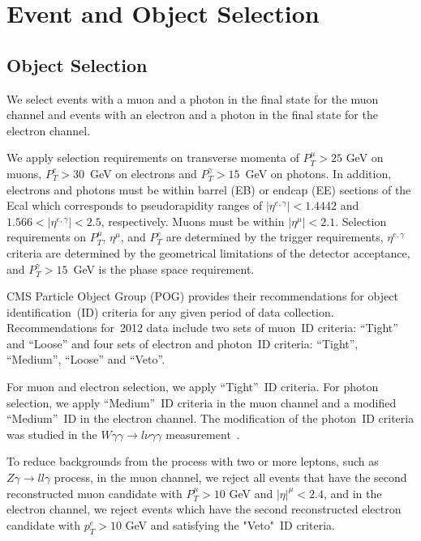\section{Event and Object Selection}
\label{sec:AN_Selection}

\subsection{Object Selection}
\label{sec:AN_ObjectSelection}

We select events with a muon and a photon in the final state for the muon channel and events with an electron and a photon in the final state for the electron channel. 

We apply selection requirements on transverse momenta of $P_T^{\mu}>25$ GeV on muons,  $P_T^e>30$~GeV on electrons and $P_T^{\gamma}>15$~GeV on photons. In addition, electrons and photons must be within barrel (EB) or endcap (EE) sections of the Ecal which corresponds to pseudorapidity ranges of $|\eta^{e,\gamma}| < 1.4442$ and $1.566 < |\eta^{e,\gamma}| < 2.5$, respectively. Muons must be within $|\eta^{\mu}|<2.1$. Selection requirements on $P_T^{\mu}$, $\eta^{\mu}$, and $P_T^e$ are determined by the trigger requirements, $\eta^{e,\gamma}$ criteria are determined by the geometrical limitations of the detector acceptance, and $P_T^{\gamma}>15$~GeV is the phase space requirement.

CMS Particle Object Group (POG) provides their recommendations for object identification~(ID) criteria for any given period of data collection. Recommendations for~2012 data include two sets of muon~ID criteria: ``Tight'' and ``Loose'' and four sets of electron and photon~ID criteria: ``Tight'', ``Medium'', ``Loose'' and ``Veto''. 

For muon and electron selection, we apply ``Tight''~ID criteria. For photon selection, we apply ``Medium''~ID criteria in the muon channel and a modified ``Medium''~ID in the electron channel. The modification of the photon~ID criteria was studied in the $W\gamma\gamma \rightarrow l\nu\gamma\gamma$ measurement~\cite{ref_Wgg8TeV}.  %

To reduce backgrounds from the process with two or more leptons, such as $Z\gamma\rightarrow l l \gamma$ process, in the muon channel, we reject all events that have the second reconstructed muon candidate with $P_T^{\mu}>10$ GeV and $|\eta|^{\mu}<2.4$, and in the electron channel, we reject events which have the second reconstructed electron candidate with $p_T^e>10$ GeV and satisfying the "Veto"~ID criteria.

